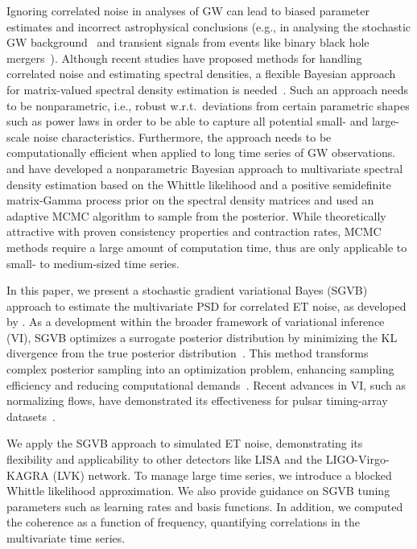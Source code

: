\documentclass[%
 reprint,
 amsmath,amssymb,
 aps,
 nofootinbib,
]{revtex4-2}
\begin{document}
Ignoring correlated noise in analyses of \ac{GW} can lead to biased parameter estimates and incorrect astrophysical conclusions (e.g., in analysing the stochastic \ac{GW} background~\cite{Thrane_correlations_SGWB, Christensen_2019_SGWB, boileau2022figures} and transient signals from events like binary black hole mergers~\cite{Cireddu:2023:arXiv}). 
Although recent studies have proposed methods for handling correlated noise and estimating spectral densities, a flexible Bayesian approach for matrix-valued spectral density estimation is needed~\cite{Cireddu:2023:arXiv,JanssensKamiel2023Ffps}. 
Such an approach needs to be nonparametric, i.e., robust w.r.t.\ deviations from certain parametric shapes such as power laws in order to be able to capture all potential small- and large-scale noise characteristics.
Furthermore, the approach needs to be computationally efficient when applied to long time series of \ac{GW} observations. 
\citet{MeierAlexander2020Bnao} and \citet{Liu2023} have developed a nonparametric Bayesian approach to multivariate spectral density estimation based on the Whittle likelihood and a positive semidefinite matrix-Gamma process prior on the spectral density matrices and used an adaptive MCMC algorithm to sample from the posterior. 
While theoretically attractive with proven consistency properties and contraction rates, MCMC methods require a large amount of computation time, thus are only applicable to small- to medium-sized time series. 

In this paper, we present a stochastic gradient variational Bayes (SGVB)  approach to estimate the multivariate \ac{PSD} for correlated \ac{ET} noise, as developed by \citet{Hu2023}. As a development within the broader framework of variational inference (VI), SGVB optimizes a surrogate posterior distribution by minimizing the \ac{KL} divergence from the true posterior distribution~\cite{Jordan1999,Wainwright2008,Blei2017}.  
This method transforms complex posterior sampling into an optimization problem, enhancing sampling efficiency and reducing computational demands~\cite{Blei2006,kingma2022}.
Recent advances in VI, such as normalizing flows, have demonstrated its effectiveness for pulsar timing-array datasets~\cite{Vallisneri2024}. 

We apply the SGVB approach to simulated ET noise, demonstrating its flexibility and applicability to other detectors like LISA and the LIGO-Virgo-KAGRA (LVK) network.
To manage large time series, we introduce a blocked Whittle likelihood approximation\citeme. 
We also provide guidance on SGVB tuning parameters such as learning rates and basis functions. 
In addition, we computed the coherence as a function of frequency, quantifying correlations in the multivariate time series.
\end{document}
